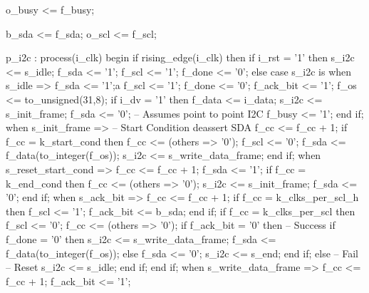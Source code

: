 \begin{VHDLlisting}[tabsize=4]
    o_busy <= f_busy;

    b_sda <= f_sda;
    o_scl <= f_scl;

    p_i2c : process(i_clk)
    begin
        if rising_edge(i_clk) then
            if i_rst = '1' then
                s_i2c <= s_idle;
				f_sda <= '1';
                f_scl <= '1';
				f_done <= '0';
            else
                case s_i2c is
                    when s_idle => 
                        f_sda <= '1';a
                        f_scl <= '1';
						f_done <= '0';
						f_ack_bit <= '1';
						f_os <= to_unsigned(31,8);
                        if i_dv = '1' then
                            f_data <= i_data;
                            s_i2c <= s_init_frame;
                            f_sda <= '0'; -- Assumes point to point I2C
                            f_busy <= '1';
                        end if;
                    when s_init_frame => 
                        -- Start Condition deassert SDA
                        f_cc <= f_cc + 1;
                        if f_cc = k_start_cond then
                            f_cc <= (others => '0');
                            f_scl <= '0';
                            f_sda <= f_data(to_integer(f_os));
                            s_i2c <= s_write_data_frame;
                        end if;
					when s_reset_start_cond => 
						f_cc <= f_cc + 1;
						f_sda <= '1';
                        if f_cc = k_end_cond then
                            f_cc <= (others => '0');
							s_i2c <= s_init_frame;
                            f_sda <= '0';
                        end if;
                    when s_ack_bit => 
                        f_cc <= f_cc + 1;
                        if f_cc = k_clks_per_scl_h then
                            f_scl <= '1';
                            f_ack_bit <= b_sda;
                        end if; 
                        if f_cc = k_clks_per_scl then
							f_scl <= '0';
							f_cc <= (others => '0');
                            if f_ack_bit = '0' then
                                -- Success
								if f_done = '0' then
									s_i2c <= s_write_data_frame;
									f_sda <= f_data(to_integer(f_os));
								else
									f_sda <= '0';
									s_i2c <= s_end;
								end if;
                            else
                                -- Fail -- Reset
                                s_i2c <= s_idle;
                            end if;
                        end if;
                    when s_write_data_frame => 
                        f_cc <= f_cc + 1;
						f_ack_bit <= '1';
						

\end{VHDLlisting}
